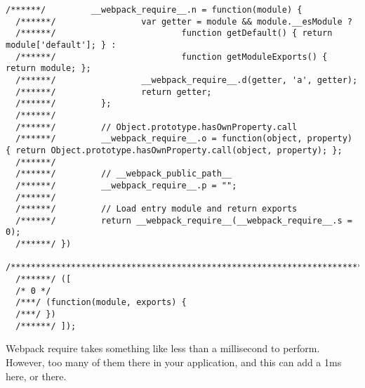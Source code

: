 \begin{lstlisting}[caption=webpack require source code]
  /******/         __webpack_require__.n = function(module) {
  /******/                 var getter = module && module.__esModule ?
  /******/                         function getDefault() { return module['default']; } :
  /******/                         function getModuleExports() { return module; };
  /******/                 __webpack_require__.d(getter, 'a', getter);
  /******/                 return getter;
  /******/         };
  /******/
  /******/         // Object.prototype.hasOwnProperty.call
  /******/         __webpack_require__.o = function(object, property) { return Object.prototype.hasOwnProperty.call(object, property); };
  /******/
  /******/         // __webpack_public_path__
  /******/         __webpack_require__.p = "";
  /******/
  /******/         // Load entry module and return exports
  /******/         return __webpack_require__(__webpack_require__.s = 0);
  /******/ })
  /************************************************************************/
  /******/ ([
  /* 0 */
  /***/ (function(module, exports) {
  /***/ })
  /******/ ]);  
\end{lstlisting}

Webpack require takes something like less than a millisecond to perform. However, too many of them there 
in your application, and this can add a 1ms here, or there. 

